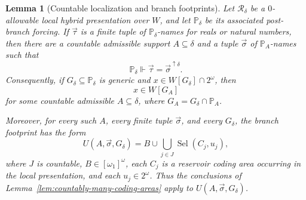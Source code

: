 \documentclass[a4paper,11pt]{article}
\newtheorem{lemma}[theorem]{Lemma}
\begin{document}
\begin{lemma}[Countable localization and branch footprints]
\label{lem:countable-localization-real-names}
Let \(\mathcal R_\delta\) be a \(0\)-allowable local hybrid presentation over
\(W\), and let \(\mathbb P_\delta\) be its associated post-branch forcing.  If
\(\vec\tau\) is a finite tuple of \(\mathbb P_\delta\)-names for reals or
natural numbers, then there are a countable admissible support
\(A\subseteq\delta\) and a tuple \(\vec\sigma\) of \(\mathbb P_A\)-names such
that
\[
   \mathbb P_\delta\Vdash
   \vec\tau=\vec\sigma^{\uparrow\delta}.
\]
Consequently, if \(G_\delta\subseteq\mathbb P_\delta\) is generic and
\(x\in W[G_\delta]\cap2^\omega\), then
\[
   x\in W[G_A]
\]
for some countable admissible \(A\subseteq\delta\), where
\(G_A=G_\delta\cap\mathbb P_A\).

Moreover, for every such \(A\), every finite tuple \(\vec\sigma\), and every
\(G_\delta\), the branch footprint has the form
\[
   U(A,\vec\sigma,G_\delta)
   =B\cup\bigcup_{j\in J}\operatorname{Sel}(C_j,u_j),
\]
where \(J\) is countable, \(B\in[\omega_1]^\omega\), each \(C_j\) is a reservoir
coding area occurring in the local presentation, and each \(u_j\in2^\omega\).
Thus the conclusions of Lemma~\ref{lem:countably-many-coding-areas} apply to
\(U(A,\vec\sigma,G_\delta)\).
\end{lemma}
\end{document}
